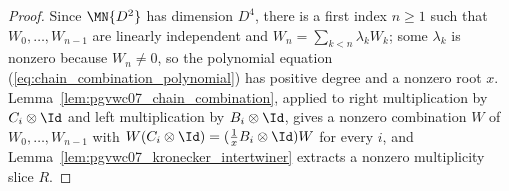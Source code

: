 \begin{proof}
    \leanok
    Since $\MN{D^2}$ has dimension $D^4$, there is a first index $n\ge1$
    such that $W_0,\ldots,W_{n-1}$ are linearly independent and
    $W_n=\sum_{k<n}\lambda_kW_k$; some $\lambda_k$ is nonzero because
    $W_n\neq0$, so the polynomial equation
    (\ref{eq:chain_combination_polynomial}) has positive degree and a nonzero
    root $x$. Lemma~\ref{lem:pgvwc07_chain_combination}, applied to right
    multiplication by $C_i\otimes\Id$ and left multiplication by
    $B_i\otimes\Id$, gives a nonzero combination $W$ of $W_0,\ldots,W_{n-1}$
    with $W(C_i\otimes\Id)=(\tfrac1xB_i\otimes\Id)W$ for every $i$, and
    Lemma~\ref{lem:pgvwc07_kronecker_intertwiner} extracts a nonzero
    multiplicity slice $R$.
\end{proof}

